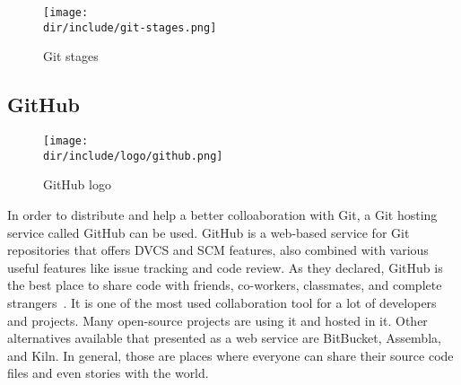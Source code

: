 \begin{figure}[htb]
  \centering
  \vspace{-10pt}
  \texttt{[image: \\dir/include/git-stages.png]}
  \caption{Git stages}
  \label{fig:git-stages}
\end{figure}

\subsection{GitHub}

\begin{wrapfigure}{r}{0.5\textwidth}
  \vspace{-20pt}
  \begin{center}
    \texttt{[image: \\dir/include/logo/github.png]}
  \end{center}
  \vspace{-20pt}
  \caption{GitHub logo}
  \label{fig:github-logo}
  \vspace{-10pt}
\end{wrapfigure}

In order to distribute and help a better colloaboration with Git, a Git hosting service called GitHub can be used.
GitHub is a web-based service for Git repositories that offers \ac{DVCS} and \ac{SCM} features, also combined with various useful features like issue tracking and code review.
As they declared, GitHub is the best place to share code with friends, co-workers, classmates, and complete strangers~\autocite{GitHub2015}.
It is one of the most used collaboration tool for a lot of developers and projects.
Many open-source projects are using it and hosted in it.
Other alternatives available that presented as a web service are BitBucket, Assembla, and Kiln.
In general, those are places where everyone can share their source code files and even stories with the world.
